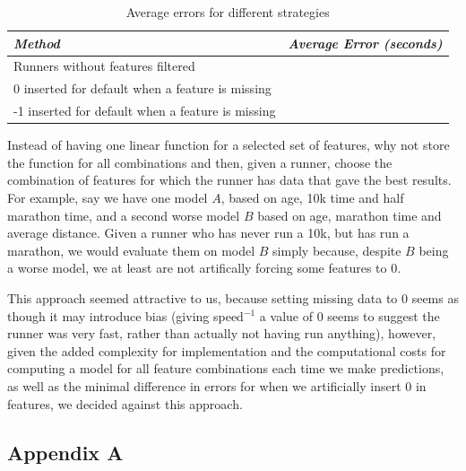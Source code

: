 \documentclass{article}
\begin{document}
\begin{table}[ht!]
    \centering
    \begin{tabular}{| l | l |}
        \hline
        {\em Method} & {\em Average Error (seconds)}  \\ \hline
        Runners without features filtered &   \\ \hline
        0 inserted for default when a feature is missing &   \\ \hline
        -1 inserted for default when a feature is missing &  \\ \hline
    \end{tabular}
    \caption{Average errors for different strategies}
    \label{tbl:avgerrs}
\end{table}


Instead of having one linear function for a selected set of features, why not store the function for all combinations
and then, given a runner, choose the combination of features for which the runner has data that gave the best results.
For example, say we have one model $A$, based on age, 10k time and half marathon time, and a second worse model $B$ based
on age, marathon time and average distance. Given a runner who has never run a 10k, but has run a marathon, we would
evaluate them on model $B$ simply because, despite $B$ being a worse model, we at least are not artifically forcing some features
to 0. 

This approach seemed attractive to us, because setting missing data to 0 seems as though it may introduce bias (giving speed$^{-1}$ a value
of 0 seems to suggest the runner was very fast, rather than actually not having run anything), however, given the
added complexity for implementation and the computational costs for computing a model for all feature combinations
each time we make predictions, as well as the minimal difference in errors for when we artificially insert $0$ in features,
we decided against this approach.



\subsection*{Appendix A}
\end{document}
